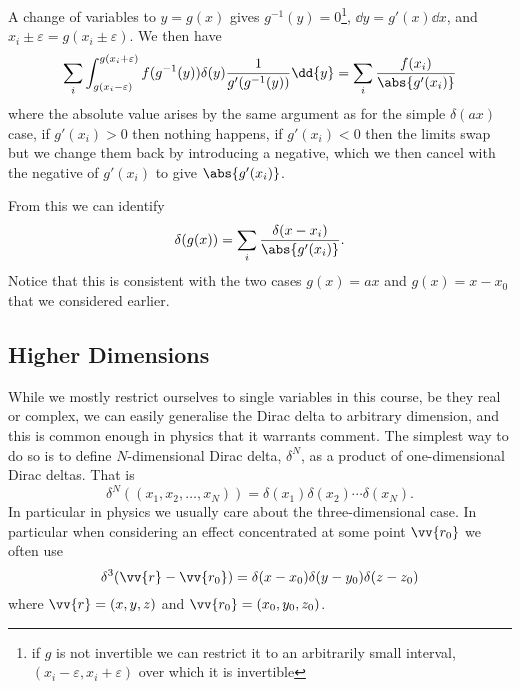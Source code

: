 \documentclass[fleqn]{NotesClass}
\begin{document}
    A change of variables to \(y = g(x)\) gives \(g^{-1}(y) = 0\)\footnote{if \(g\) is not invertible we can restrict it to an arbitrarily small interval, \((x_i - \varepsilon, x_i + \varepsilon)\) over which it is invertible}, \(\dd{y} = g'(x)\dd{x}\), and \(x_i \pm \varepsilon = g(x_i \pm \varepsilon)\).
    We then have
    \begin{equation}
        \sum_{i} \int_{g(x_i - \varepsilon)}^{g(x_i + \varepsilon)} f(g^{-1}(y))\delta(y)\frac{1}{g'(g^{-1}(y))} \dd{y} = \sum_{i} \frac{f(x_i)}{\abs{g'(x_i)}}
    \end{equation}
    where the absolute value arises by the same argument as for the simple \(\delta(ax)\) case, if \(g'(x_i) > 0\) then nothing happens, if \(g'(x_i) < 0\) then the limits swap but we change them back by introducing a negative, which we then cancel with the negative of \(g'(x_i)\) to give \(\abs{g'(x_i)}\).
    
    From this we can identify
    \begin{equation}
        \delta(g(x)) = \sum_{i} \frac{\delta(x - x_i)}{\abs{g'(x_i)}}.
    \end{equation}
    Notice that this is consistent with the two cases \(g(x) = ax\) and \(g(x) = x - x_0\) that we considered earlier.
    
    \subsection{Higher Dimensions}
    While we mostly restrict ourselves to single variables in this course, be they real or complex, we can easily generalise the Dirac delta to arbitrary dimension, and this is common enough in physics that it warrants comment.
    The simplest way to do so is to define \(N\)-dimensional Dirac delta, \(\delta^{N}\), as a product of one-dimensional Dirac deltas.
    That is
    \begin{equation}
        \delta^N((x_1, x_2, \dotsc, x_N)) = \delta(x_1)\delta(x_2)\dotsm \delta(x_N).
    \end{equation}
    In particular in physics we usually care about the three-dimensional case.
    In particular when considering an effect concentrated at some point \(\vv{r_0}\) we often use
    \begin{equation}
        \delta^3(\vv{r} - \vv{r_0}) = \delta(x - x_0)\delta(y - y_0)\delta(z - z_0)
    \end{equation}
    where \(\vv{r} = (x, y, z)\) and \(\vv{r_0} = (x_0, y_0, z_0)\).
    
\end{document}
